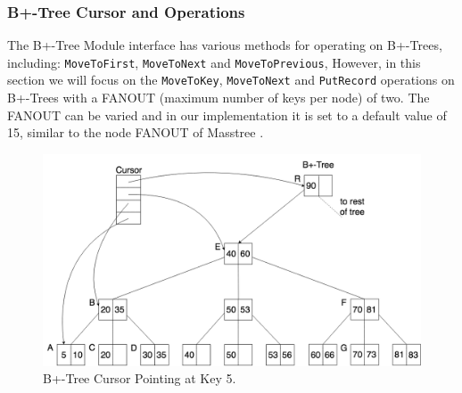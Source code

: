 \subsubsection {B+-Tree Cursor and Operations}

The B+-Tree Module interface has various methods for operating on B+-Trees, including: \texttt{MoveToFirst}, \texttt{MoveToNext} and \texttt{MoveToPrevious}, However, in this section we will focus on the \texttt{MoveToKey}, \texttt{MoveToNext} and \texttt{PutRecord} operations on B+-Trees with a FANOUT (maximum number of keys per node) of two. The FANOUT can be varied and in our implementation it is set to a default value of 15, similar to the node FANOUT of Masstree \cite{masstree}. 

\begin{figure}[h]
    \centering
    \includegraphics[scale=0.30]{figures/CursorAt5.png}
    \caption{B+-Tree Cursor Pointing at Key 5.}
    \label{fig:exB+Cursor5}
\end{figure}

